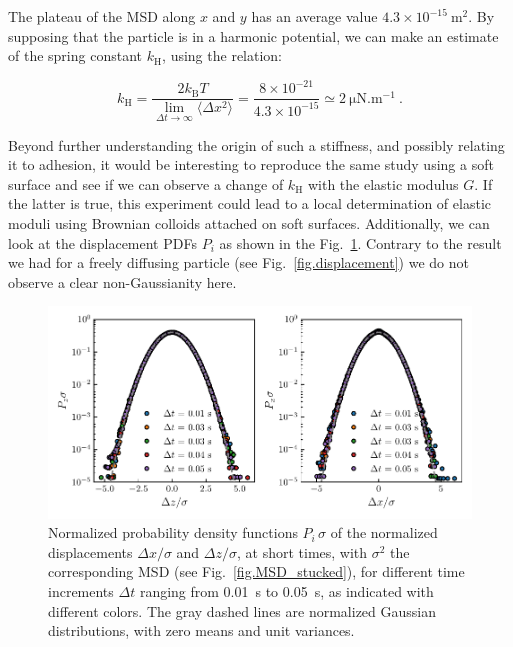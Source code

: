 The plateau of the MSD along  $x$ and $y$ has an average value   $4.3 \times 10 ^{-15} ~ \mathrm{m^2}$. By supposing that the particle is in a harmonic potential, we can make an estimate of the spring constant $k_\mathrm{H}$, using the relation:

\begin{equation}
	k_\mathrm{H} = \frac{2  k_\mathrm{B} T}{ \lim\limits_{\Delta t \rightarrow \infty }\langle \Delta x ^2 \rangle} = \frac{8 \times 10^{-21}}{4.3 \times 10 ^{-15}} \simeq 2 ~ \mathrm{\mu N . m^{-1}}~.
\end{equation}

Beyond further understanding the origin of such a stiffness, and possibly relating it to adhesion, it would be interesting to reproduce the same study using a soft surface and see if we can observe a change of $k_\mathrm{H}$ with the elastic modulus $G$. If the latter is true, this experiment could lead to a local determination of elastic moduli using Brownian colloids attached on soft surfaces. Additionally, we can look at the displacement \gls{PDF}s $P_i$ as shown in the Fig.~\ref{fig.P_dxz_stucked}. Contrary to the result we had for a freely diffusing particle (see Fig.~\ref{fig.displacement}) we do not observe a clear non-Gaussianity here.


\begin{figure}[H]
	\centering
	\includegraphics{02_body/chapter4/images/stucked_particle/P_xz_stucked.pdf}
	\caption{ Normalized probability density functions $P_i\,\sigma$ of the normalized displacements $\Delta x/\sigma$ and $\Delta z/\sigma$, at short times, with $\sigma^2$ the corresponding MSD (see Fig.~\ref{fig.MSD_stucked}), for different time increments $\Delta t$ ranging from 0.01~s to 0.05~s, as indicated with different colors. The gray dashed lines are normalized Gaussian distributions, with zero means and unit variances.}
	\label{fig.P_dxz_stucked}
\end{figure}


